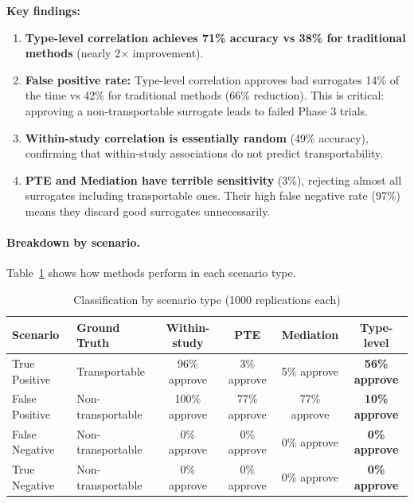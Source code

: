 \documentclass{article}
\begin{document}
\textbf{Key findings:}
\begin{enumerate}
    \item \textbf{Type-level correlation achieves 71\% accuracy vs 38\% for traditional methods} (nearly 2$\times$ improvement).

    \item \textbf{False positive rate:} Type-level correlation approves bad surrogates 14\% of the time vs 42\% for traditional methods (66\% reduction). This is critical: approving a non-transportable surrogate leads to failed Phase 3 trials.

    \item \textbf{Within-study correlation is essentially random} (49\% accuracy), confirming that within-study associations do not predict transportability.

    \item \textbf{PTE and Mediation have terrible sensitivity} (3\%), rejecting almost all surrogates including transportable ones. Their high false negative rate (97\%) means they discard good surrogates unnecessarily.
\end{enumerate}

\paragraph{Breakdown by scenario.} Table~\ref{tab:by-scenario} shows how methods perform in each scenario type.

\begin{table}[h]
\centering
\caption{Classification by scenario type (1000 replications each)}
\label{tab:by-scenario}
\begin{tabular}{llcccc}
\toprule
Scenario & Ground Truth & Within-study & PTE & Mediation & Type-level \\
\midrule
True Positive & Transportable & 96\% approve & 3\% approve & 5\% approve & \textbf{56\% approve} \\
False Positive & Non-transportable & 100\% approve & 77\% approve & 77\% approve & \textbf{10\% approve} \\
False Negative & Non-transportable & 0\% approve & 0\% approve & 0\% approve & \textbf{0\% approve} \\
True Negative & Non-transportable & 0\% approve & 0\% approve & 0\% approve & \textbf{0\% approve} \\
\bottomrule
\end{tabular}
\end{table}
\end{document}
